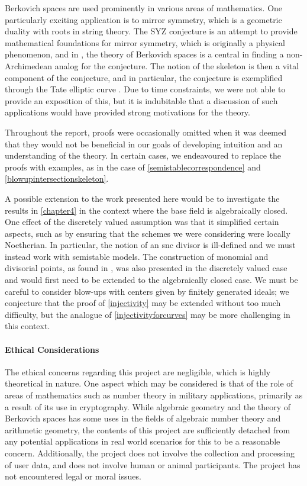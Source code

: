 Berkovich spaces are used prominently in various areas of mathematics.
One particularly exciting application is to mirror symmetry, which is a geometric duality with roots in string theory.
The SYZ conjecture is an attempt to provide mathematical foundations for mirror symmetry, which is originally a physical phenomenon, and in \parencite{kontsevich}, the theory of Berkovich spaces is a central in finding a non-Archimedean analog for the conjecture.
The notion of the skeleton is then a vital component of the conjecture, and in particular, the conjecture is exemplified through the Tate elliptic curve \parencite{vietnam}.
Due to time constraints, we were not able to provide an exposition of this, but it is indubitable that a discussion of such applications would have provided strong motivations for the theory.

Throughout the report, proofs were occasionally omitted when it was deemed that they would not be beneficial in our goals of developing intuition and an understanding of the theory.
In certain cases, we endeavoured to replace the proofs with examples, as in the case of \cref{semistablecorrespondence} and \cref{blowupintersectionskeleton}. 

A possible extension to the work presented here would be to investigate the results in \cref{chapter4} in the context where the base field is algebraically closed.
One effect of the discretely valued assumption was that it simplified certain aspects, such as by ensuring that the schemes we were considering were locally Noetherian.
In particular, the notion of an snc divisor is ill-defined and we must instead work with semistable models.
The construction of monomial and divisorial points, as found in \parencite{MN}, was also presented in the discretely valued case and would first need to be extended to the algebraically closed case.
We must be careful to consider blow-ups with centers given by finitely generated ideals;
we conjecture that the proof of \cref{injectivity} may be extended without too much difficulty, but the analogue of \cref{injectivityforcurves} may be more challenging in this context.

\paragraph{Ethical Considerations}

The ethical concerns regarding this project are negligible, which is highly theoretical in nature. 
One aspect which may be considered is that of the role of areas of mathematics such as number theory in military applications, primarily as a result of its use in cryptography. 
While algebraic geometry and the theory of Berkovich spaces has some uses in the fields of algebraic number theory and arithmetic geometry, the contents of this project are sufficiently detached from any potential applications in real world scenarios for this to be a reasonable concern. 
Additionally, the project does not involve the collection and processing of user data, and does not involve human or animal participants.
The project has not encountered legal or moral issues.
